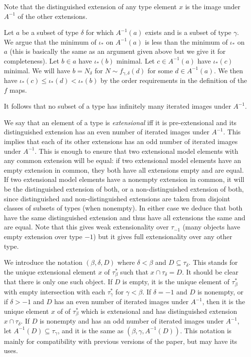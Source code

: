 \documentclass[112pt]{article}
\begin{document}
\begin{description}
Note that the distinguished extension of any type element $x$ is the image under $A^{-1}$ of the other extensions.

Let $a$ be a subset of type $\delta$ for which $A^{-1}(a)$ exists and is a subset of type $\gamma$.  We argue that the minimum of $\iota_*$ on
$A^{-1}(a)$ is less than the minimum of $\iota_*$ on $a$ (this is basically the same as an argument given above but we give it for completeness).    Let $b \in a$ have $\iota_*(b)$ minimal.  Let $c \in A^{-1}(a)$ have $\iota_*(c)$ minimal.   We will have $b = N_\delta$ for $N \sim f_{\gamma,\delta}(d)$ for some $d \in A^{-1}(a)$.  We then
have $\iota_*(c) \leq \iota_*(d) < \iota_*(b)$ by the order requirements in the definition of the $f$ maps.


  It follows that no subset of a type has
infinitely many iterated images under $A^{-1}$.



We say that an element of a type is {\em extensional\/} iff
it is pre-extensional and its distinguished extension has an even number of iterated images under $A^{-1}$.
This implies that each of its other extensions has an odd number of iterated images under $A^{-1}$.  This is enough to ensure that two extensional model elements with any common extension will be equal:  if two extensional model elements have an empty extension in common, they both have all extensions empty and are equal.  If two extensional model elements have a nonempty extension in common, it will be the distinguished extension of both, or a non-distinguished extension of both, since distinguished and non-distinguished extensions are taken from disjoint classes of subsets of types (when nonempty).
In either case we deduce that both have the same distinguished extension and thus have all extensions the same and are equal.  Note that this gives weak extensionality over $\tau_{-1}$ (many objects have empty extension over type $-1$) but it gives full extensionality over any other type.

We introduce the notation $(\beta,\delta,D)$ where $\delta<\beta$ and  $D \subseteq \tau_\delta$.   This stands for the unique extensional element $x$ of $\tau_\beta^*$ such that $x \cap \tau_\delta = D$.  It should be clear that there is only one such object.  If $D$ is empty, it is the unique
element of $\tau_\beta^*$ with empty intersection with each $\tau_\gamma^*$ for $\gamma<\beta$.  If $\delta=-1$ and $D$ is nonempty, or if $\delta >-1$
and $D$ has an even number of iterated images under $A^{-1}$, then it is the unique element $x$ of of $\tau_\beta^*$ which is extensional and has distinguished extension $x \cap \tau_\delta$.  If $D$ is nonempty and has an odd number of iterated images under $A^{-1}$, let $A^{-1}(D) \subseteq \tau_\gamma$, and it is the same as $(\beta,\gamma,A^{-1}(D))$.  This notation is mainly for compatibility with previous versions of the paper, but may have its uses.


\end{description}
\end{document}
